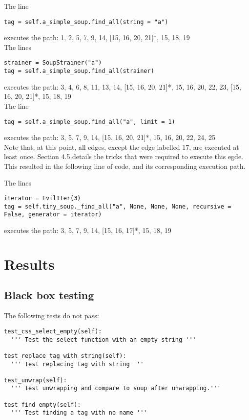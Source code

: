 \documentclass[10pt]{article}
\begin{document}
The line
\begin{lstlisting}[style = pythonstyle-small]
tag = self.a_simple_soup.find_all(string = "a")
\end{lstlisting}
executes the path: 1, 2, 5, 7, 9, 14, [15, 16, 20, 21]*, 15, 18, 19 \\

The lines
\begin{lstlisting}[style = pythonstyle-small]
strainer = SoupStrainer("a")
tag = self.a_simple_soup.find_all(strainer)
\end{lstlisting}
executes the path: 3, 4, 6, 8, 11, 13, 14, [15, 16, 20, 21]*, 15, 16, 20, 22, 23, [15, 16, 20, 21]*, 15, 18, 19 \\

The line
\begin{lstlisting}[style = pythonstyle-small]
tag = self.a_simple_soup.find_all("a", limit = 1)
\end{lstlisting}
executes the path: 3, 5, 7, 9, 14, [15, 16, 20, 21]*, 15, 16, 20, 22, 24, 25 \\

Note that, at this point, all edges, except the edge labelled 17, are executed at least once. Section 4.5 details the tricks that were required to execute this egde. This resulted in the following line of code, and its corresponding execution path. 

The lines
\begin{lstlisting}[style = pythonstyle-small]
iterator = EvilIter(3)
tag = self.tiny_soup._find_all("a", None, None, None, recursive = False, generator = iterator)
\end{lstlisting}
executes the path: 3, 5, 7, 9, 14, [15, 16, 17]*, 15, 18, 19 



\section{Results}

\subsection{Black box testing}

The following tests do not pass:

\begin{lstlisting}[style = pythonstyle]
test_css_select_empty(self):
  ''' Test the select function with an empty string '''

test_replace_tag_with_string(self):
  ''' Test replacing tag with string '''

test_unwrap(self):
  ''' Test unwrapping and compare to soup after unwrapping.'''

test_find_empty(self):
  ''' Test finding a tag with no name '''
\end{lstlisting}
\end{document}
